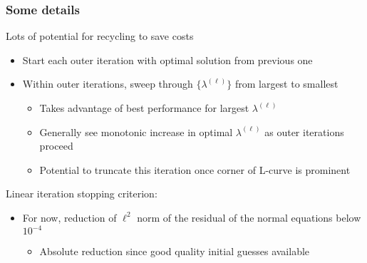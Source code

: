 \documentclass[12pt,t,xcolor=dvipsnames]{beamer}
\begin{document}
\begin{frame}
  \frametitle{Some details}

  Lots of potential for recycling to save costs
  \begin{itemize}
\item Start each outer iteration with optimal solution from previous one
  \item Within outer iterations, sweep through $\{\lambda^{(\ell)}\}$
    from largest to smallest
    \begin{itemize}
    \item Takes advantage of best performance for largest
      $\lambda^{(\ell)}$
    \item Generally see monotonic increase in optimal
      $\lambda^{(\ell)}$ as outer iterations proceed
    \item Potential to truncate this iteration once corner of
      L-curve is prominent
    \end{itemize}
    
  \end{itemize}
  
  Linear iteration stopping criterion:
  \begin{itemize}
  \item For now, reduction of $\ell^2$ norm of the residual of
  the normal equations below $10^{-4}$
  \begin{itemize}
  \item Absolute reduction since good quality initial guesses available
  \end{itemize}
  \end{itemize}
  
\end{frame}
\end{document}
